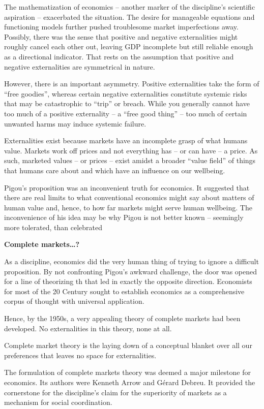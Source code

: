 \documentclass[
]{book}
\begin{document}
The mathematization of economics -- another marker of the discipline's
scientific aspiration -- exacerbated the situation.
The desire for manageable equations and functioning models
further pushed troublesome market imperfections away.
Possibly, there was the sense that positive and negative externalities
might roughly cancel each other out, leaving GDP incomplete
but still reliable enough as a directional indicator.
That rests on the assumption that positive and negative externalities are
symmetrical in nature.

However, there is an important asymmetry.
Positive externalities take the form of ``free goodies'', whereas certain negative externalities constitute systemic risks that
may be catastrophic to ``trip'' or breach. While you generally cannot have too much of a
positive externality -- a ``free good thing'' -- too much of certain unwanted harms may induce
systemic failure.

Externalities exist because markets have an incomplete grasp of what humans value. Markets
work off prices and not everything has -- or can have -- a price. As such, marketed values -- or
prices -- exist amidst a broader ``value field'' of things that humans care about and which have
an influence on our wellbeing.

Pigou's proposition was an inconvenient truth for economics. It suggested that there are real
limits to what conventional economics might say about matters of human value and, hence, to
how far markets might serve human wellbeing. The inconvenience of his idea may be why
Pigou is not better known -- seemingly more tolerated, than celebrated

\textbf{Complete markets\ldots?}

As a discipline, economics did the very human thing of trying to ignore a difficult proposition.
By not confronting Pigou's awkward challenge, the door was opened for a line of theorizing
th
that led in exactly the opposite direction. Economists for most of the 20 Century sought to
establish economics as a comprehensive corpus of thought with universal application.

Hence, by the 1950s, a very appealing theory of complete markets had been developed. No
externalities in this theory, none at all.

Complete market theory is the laying
down of a conceptual blanket over all our preferences that leaves no space for externalities.

The formulation of complete markets theory was deemed a major milestone for economics. Its authors were Kenneth Arrow and Gérard Debreu.
It provided the cornerstone for the discipline's claim for the
superiority of markets as a mechanism for social coordination.
\end{document}
